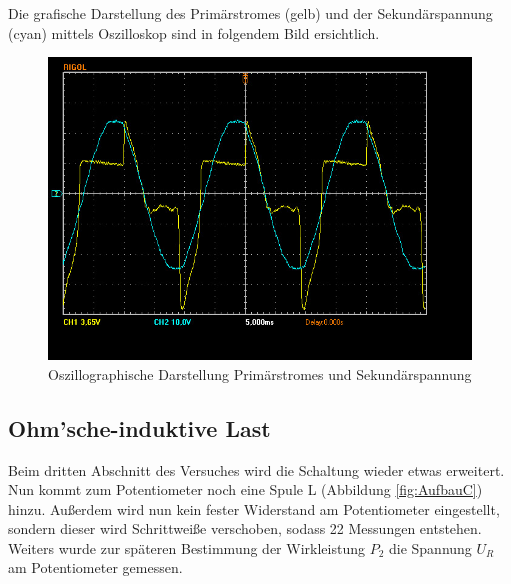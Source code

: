 \documentclass[12pt,a4paper,twoside]{article}
\begin{document}
\noindent
Die grafische Darstellung des Primärstromes (gelb) und der Sekundärspannung (cyan) mittels Oszilloskop sind in folgendem Bild ersichtlich.

\begin{figure}[H]
    \centering
    \includegraphics[width=0.6\linewidth, angle=0]{nudes/A2 Oszi.jpg}
    \caption{Oszillographische Darstellung Primärstromes und Sekundärspannung}
    \label{fig:OszilloskopB}
\end{figure}


\subsection{Ohm'sche-induktive Last}

Beim dritten Abschnitt des Versuches wird die Schaltung wieder etwas erweitert. Nun kommt zum Potentiometer noch eine Spule L (Abbildung \ref{fig:AufbauC}) hinzu.
Außerdem wird nun kein fester Widerstand am Potentiometer eingestellt, sondern dieser wird Schrittweiße verschoben, sodass 22 Messungen entstehen. Weiters wurde zur späteren Bestimmung der Wirkleistung $P_{2}$ die Spannung $U_{R}$ am Potentiometer gemessen.
\end{document}
